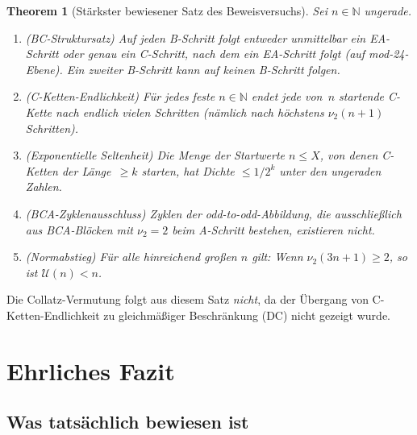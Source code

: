 \documentclass[12pt,a4paper]{article}
\newtheorem{theorem}[definition]{Theorem}
\newcommand{\vii}{\nu_2}
\newcommand{\U}{\mathcal{U}}
\newcommand{\N}{\mathbb{N}}
\begin{document}
\begin{theorem}[Stärkster bewiesener Satz des Beweisversuchs]
\label{thm:haupt}
Sei $n \in \N$ ungerade.
\begin{enumerate}[label=(\arabic*)]
  \item \emph{(BC-Struktursatz)} Auf jeden B-Schritt folgt entweder unmittelbar
    ein EA-Schritt oder genau ein C-Schritt, nach dem ein EA-Schritt folgt
    (auf mod-24-Ebene). Ein zweiter B-Schritt kann auf keinen B-Schritt folgen.

  \item \emph{(C-Ketten-Endlichkeit)} Für jedes feste $n \in \N$ endet
    jede von~$n$ startende C-Kette nach endlich vielen Schritten
    (nämlich nach höchstens $\vii(n+1)$ Schritten).

  \item \emph{(Exponentielle Seltenheit)} Die Menge der Startwerte
    $n \leq X$, von denen C-Ketten der Länge~$\geq k$ starten,
    hat Dichte $\leq 1/2^k$ unter den ungeraden Zahlen.

  \item \emph{(B\textbullet C\textbullet A-Zyklenausschluss)} Zyklen der
    odd-to-odd-Abbildung, die ausschließlich aus B\textbullet C\textbullet A-Blöcken
    mit $\vii = 2$ beim A-Schritt bestehen, existieren nicht.

  \item \emph{(Normabstieg)} Für alle hinreichend großen $n$ gilt:
    Wenn $\vii(3n+1) \geq 2$, so ist $\U(n) < n$.
\end{enumerate}
\end{theorem}

Die Collatz-Vermutung folgt aus diesem Satz \emph{nicht},
da der Übergang von C-Ketten-Endlichkeit zu gleichmäßiger Beschränkung
(DC) nicht gezeigt wurde.

\section{Ehrliches Fazit}
\label{sec:fazit}

\subsection{Was tatsächlich bewiesen ist}
\end{document}
